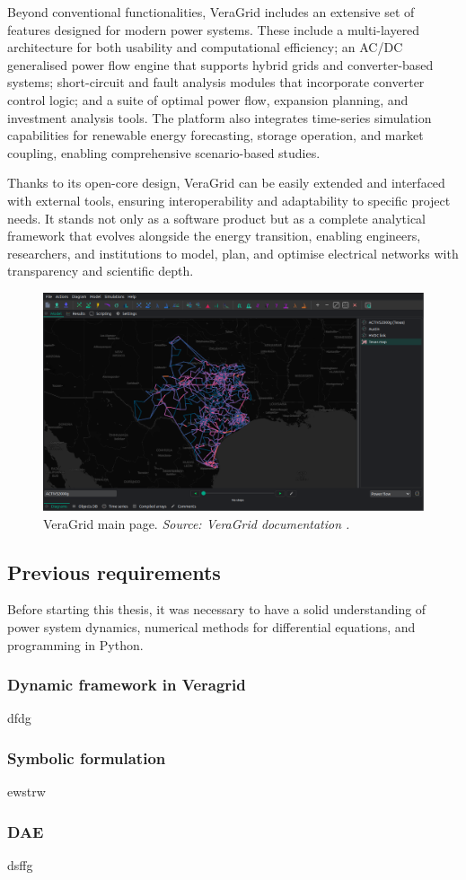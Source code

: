 Beyond conventional functionalities, VeraGrid includes an extensive set of features designed for modern power systems. 
These include a multi-layered architecture for both usability and computational efficiency; an AC/DC generalised power flow engine that supports hybrid 
grids and converter-based systems; short-circuit and fault analysis modules that incorporate converter control logic; and a suite of optimal power flow, expansion planning, 
and investment analysis tools. The platform also integrates time-series simulation capabilities for renewable energy forecasting, storage operation, and market coupling, 
enabling comprehensive scenario-based studies. 

Thanks to its open-core design, VeraGrid can be easily extended and interfaced with external tools, ensuring interoperability and adaptability to specific project needs. 
It stands not only as a software product but as a complete analytical framework that evolves alongside the energy transition, enabling engineers, researchers, and institutions 
to model, plan, and optimise electrical networks with transparency and scientific depth.

\begin{figure}
  \centering
  \includegraphics[width=0.8\linewidth]{figures/VeraGrid_main_page.png}
  \caption{VeraGrid main page. \textit{Source: VeraGrid documentation \cite{veragrid}.}}
  \label{fig:VeraGrid_main}
\end{figure}


\subsection{Previous requirements}

Before starting this thesis, it was necessary to have a solid understanding of power system dynamics, numerical methods for differential equations,
 and programming in Python.

\subsubsection{Dynamic framework in Veragrid}

dfdg

\subsubsection{Symbolic formulation}

ewstrw

\subsubsection{DAE}

dsffg

\newpage